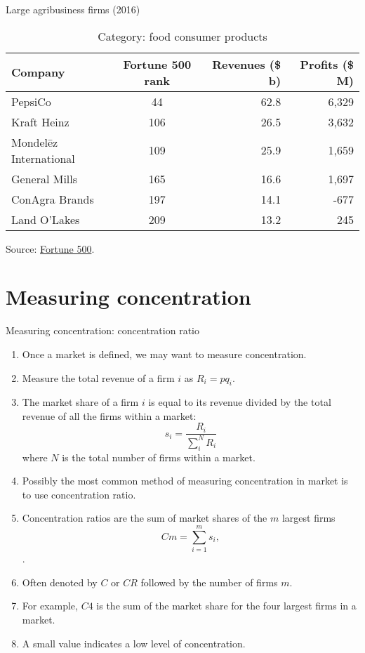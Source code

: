 \documentclass[table,xcolor=pdftex,dvipsnames]{beamer}\usepackage[]{graphicx}\usepackage[]{color}
\begin{document}
\begin{frame}{Large agribusiness firms (2016)}
\begin{table}
\caption{Category: food consumer products}
\begin{tabular}{l c r r}
  \toprule
  Company & \parbox[c]{0.75in}{Fortune 500 rank} & \parbox[c]{0.65in}{\centering Revenues (\$ b)} & \parbox[c]{0.60in}{\centering Profits (\$ M)}\\
  \midrule
  PepsiCo & 44 & 62.8 & 6,329 \\
  Kraft Heinz & 106 & 26.5 & 3,632 \\
  Mondel\={e}z International & 109 & 25.9 & 1,659 \\
  General Mills & 165 & 16.6 & 1,697 \\
  ConAgra Brands & 197 & 14.1 & -677 \\
  Land O'Lakes & 209 & 13.2 & 245 \\
  \bottomrule
\end{tabular}
\end{table}
Source: \href{http://fortune.com/fortune500/}{Fortune 500}.
\end{frame}


\section{Measuring concentration}

\begin{frame}[allowframebreaks]{Measuring concentration:  concentration ratio}
\begin{enumerate}[label=\textbullet]
  \item Once a market is defined, we may want to measure concentration.
  \item Measure the total revenue of a firm $i$ as $R_i = p q_i$.
  \item The market share of a firm $i$ is equal to its revenue divided by the total revenue of all the firms within a market:\[ s_i = \frac{R_i}{\sum_i^N R_i} \]
  where $N$ is the total number of firms within a market.
  \item Possibly the most common method of measuring concentration in market is to use concentration ratio.
  \item Concentration ratios are the sum of market shares of the $m$ largest firms \[ Cm = \sum_{i=1}^{m} s_i,\].
  \vspace{-\baselineskip}
  \item Often denoted by $C$ or $CR$ followed by the number of firms $m$.
  \item For example, $C4$ is the sum of the market share for the four largest firms in a market.
  \item A small value indicates a low level of concentration.
\end{enumerate}
\end{frame}
\end{document}
